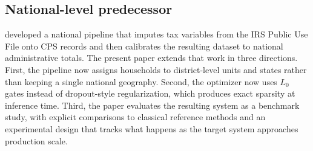 \subsection{National-level predecessor}

\citet{woodruff2024} developed a national pipeline that imputes tax variables from the IRS Public
Use File onto CPS records and then calibrates the resulting dataset to national administrative
totals. The present paper extends that work in three directions. First, the pipeline now assigns
households to district-level units and states rather than keeping a single national geography.
Second, the optimizer now uses $L_0$ gates instead of dropout-style regularization, which produces
exact sparsity at inference time. Third, the paper evaluates the resulting system as a benchmark
study, with explicit comparisons to classical reference methods and an experimental design that
tracks what happens as the target system approaches production scale.
